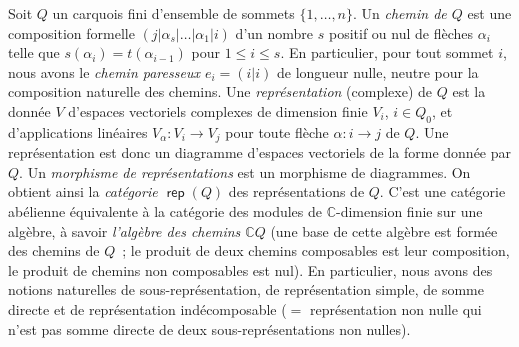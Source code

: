 \documentclass[brochure,12pt]{bourbaki}
\numberwithin{equation}{subsection}
\numberwithin{theorem}{section}
\newcommand{\opname}[1]{\operatorname{\mathsf{#1}}}
\newcommand{\rep}{\opname{rep}\nolimits}
\renewcommand{\rep}{\opname{rep}\nolimits}
\newcommand{\C}{\mathbb{C}}
\begin{document}
Soit $Q$ un carquois fini d'ensemble de sommets $\{1, \ldots, n\}$.
Un {\em chemin de $Q$} est une composition formelle $(j|\alpha_s| \ldots | \alpha_1|i)$
d'un nombre $s$ positif ou nul de fl\`eches $\alpha_i$ telle que 
$s(\alpha_i)=t(\alpha_{i-1})$ pour $1\leq i\leq s$.
En particulier, pour tout sommet $i$, nous avons le {\em chemin paresseux
$e_i=(i|i)$} de longueur nulle, neutre pour la composition naturelle des chemins.
Une {\em repr\'esentation} (complexe) de $Q$ est la
donn\'ee $V$ d'espaces vectoriels complexes de dimension finie $V_i$,
$i\in Q_0$, et d'applications lin\'eaires $V_\alpha: V_i \to V_j$ pour
toute fl\`eche $\alpha: i\to j$ de $Q$. Une repr\'esentation est donc
un diagramme d'espaces vectoriels de la forme donn\'ee par $Q$. Un
{\em morphisme de repr\'esentations} est un morphisme de diagrammes.
On obtient ainsi la {\em cat\'egorie $\rep(Q)$} des repr\'esentations
de $Q$. C'est une cat\'egorie ab\'elienne \'equivalente
\`a la cat\'egorie des modules de $\C$-dimension finie sur une
alg\`ebre, \`a savoir {\em l'alg\`ebre des chemins $\C Q$} (une base
de cette alg\`ebre est form\'ee des chemins de $Q$~; le produit de
deux chemins composables est leur composition,
le produit de chemins non composables est nul). En particulier,
nous avons des notions naturelles de sous-repr\'esentation, de
repr\'esentation simple, de somme directe et de repr\'esentation
ind\'ecomposable ($=$ repr\'esentation non nulle qui n'est pas somme
directe de deux sous-repr\'esentations non nulles).
\end{document}
